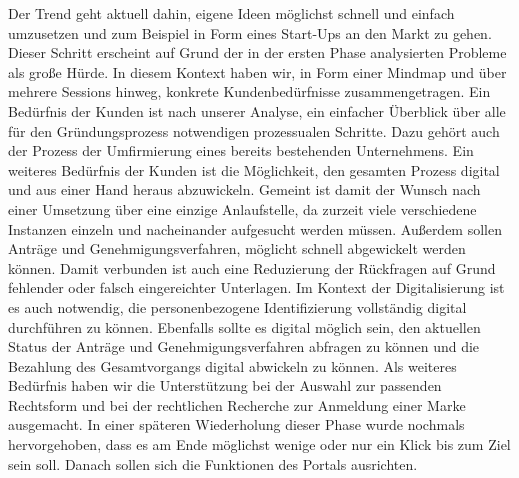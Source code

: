 Der Trend geht aktuell dahin, eigene Ideen möglichst schnell und einfach umzusetzen und zum Beispiel in Form eines Start-Ups an den Markt zu gehen. Dieser Schritt erscheint auf Grund der in der ersten Phase analysierten Probleme als große Hürde. In diesem Kontext haben wir, in Form einer Mindmap und über mehrere Sessions hinweg, konkrete Kundenbedürfnisse zusammengetragen.
Ein Bedürfnis der Kunden ist nach unserer Analyse, ein einfacher Überblick über alle für den Gründungsprozess notwendigen prozessualen Schritte. Dazu gehört auch der Prozess der Umfirmierung eines bereits bestehenden Unternehmens.
Ein weiteres Bedürfnis der Kunden ist die Möglichkeit, den gesamten Prozess digital und aus einer Hand heraus abzuwickeln. Gemeint ist damit der Wunsch nach einer Umsetzung über eine einzige Anlaufstelle, da zurzeit viele verschiedene Instanzen einzeln und nacheinander aufgesucht werden müssen. Außerdem sollen Anträge und Genehmigungsverfahren, möglicht schnell abgewickelt werden können. Damit verbunden ist auch eine Reduzierung der Rückfragen auf Grund fehlender oder falsch eingereichter Unterlagen.
Im Kontext der Digitalisierung ist es auch notwendig, die personenbezogene Identifizierung vollständig digital durchführen zu können. Ebenfalls sollte es digital möglich sein, den aktuellen Status der Anträge und Genehmigungsverfahren abfragen zu können und die Bezahlung des Gesamtvorgangs digital abwickeln zu können.
Als weiteres Bedürfnis haben wir die Unterstützung bei der Auswahl zur passenden Rechtsform und bei der rechtlichen Recherche zur Anmeldung einer Marke ausgemacht.
In einer späteren Wiederholung dieser Phase wurde nochmals hervorgehoben, dass es am Ende möglichst wenige oder nur ein Klick bis zum Ziel sein soll. Danach sollen sich die Funktionen des Portals ausrichten.